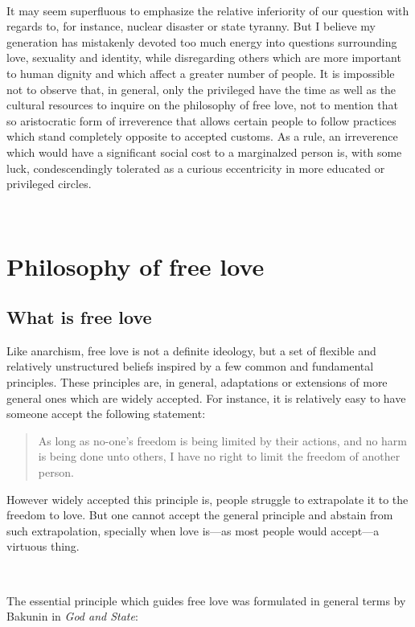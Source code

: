 \documentclass[a4paper, 12pt]{article}
\begin{document}
~

It may seem superfluous to emphasize the relative inferiority of
our question with regards to, for instance, nuclear disaster or state tyranny.
But I believe my generation has mistakenly devoted too much energy into
questions surrounding love, sexuality and identity, while disregarding others
which are more important to human dignity and which affect a greater number of
people. It is impossible not to observe that, in general, only the privileged
have the time as well as the cultural resources to inquire on the philosophy of
free love, not to mention that so aristocratic form of irreverence that allows
certain people to follow practices which stand completely opposite to accepted
customs. As a rule, an irreverence which would have a significant social cost
to a marginalzed person is, with some luck, condescendingly tolerated as a curious
eccentricity in more educated or privileged circles.

~ 

\section{Philosophy of free love}

\subsection{What is free love}

Like anarchism, free love is not a definite ideology, but a set of flexible and
relatively unstructured beliefs inspired by a few common and fundamental principles. 
These principles are, in general, adaptations or extensions of more general
ones which are widely accepted. For instance, it is relatively easy to have
someone accept the following statement:

\begin{quote}
    As long as no-one's freedom is being limited by their actions, and no harm is being done unto others, I have no right to limit the freedom of another person.
\end{quote}

However widely accepted this principle is, people struggle to extrapolate it to
the freedom to love. But one cannot accept the general principle and abstain
from such extrapolation, specially when love is---as most people would
accept---a virtuous thing. 

~ 

The essential principle which guides free love was formulated in general terms by 
Bakunin in \textit{God and State}:
\end{document}
